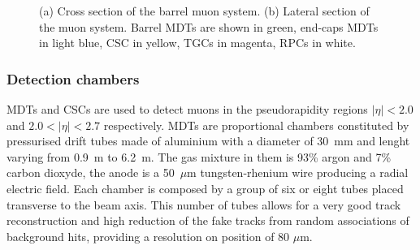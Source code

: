 \begin{figure}[tb]\begin{center}
	\caption{(a) Cross section of the barrel muon system. (b) Lateral section of the muon system. 
        Barrel MDTs are shown in green, end-caps MDTs in light blue, CSC in yellow, 
        TGCs in magenta, RPCs in white.%
        }
\end{center}\end{figure}


\subsubsection{Detection chambers}

MDTs and CSCs are used to detect muons in the pseudorapidity regions $|\eta|<2.0$ and
$2.0<|\eta|<2.7$ respectively. MDTs are proportional chambers constituted by 
pressurised drift tubes made of aluminium with a diameter of 30~mm and lenght varying from 0.9~m to 6.2~m. 
The gas mixture in them is 93\% argon and 7\% carbon dioxyde, the anode is a 50~$\mu$m
tungsten-rhenium wire producing a radial electric field. Each chamber is composed by 
a group of six or eight tubes placed transverse to the beam axis. This number of tubes allows
for a very good track reconstruction and high reduction of the fake tracks from random 
associations of background hits, providing a resolution on position of 80 $\mu$m.


